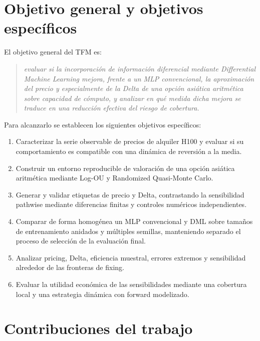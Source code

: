 \section{Objetivo general y objetivos específicos}
\label{sec:objetivos}

El objetivo general del TFM es:

\begin{quote}
\emph{evaluar si la incorporación de información diferencial mediante
Differential Machine Learning mejora, frente a un MLP convencional, la
aproximación del precio y especialmente de la Delta de una opción asiática
aritmética sobre capacidad de cómputo, y analizar en qué medida dicha mejora
se traduce en una reducción efectiva del riesgo de cobertura.}
\end{quote}

Para alcanzarlo se establecen los siguientes objetivos específicos:

\begin{enumerate}
    \item Caracterizar la serie observable de precios de alquiler H100 y evaluar
    si su comportamiento es compatible con una dinámica de reversión a la media.

    \item Construir un entorno reproducible de valoración de una opción asiática
    aritmética mediante Log-OU y Randomized Quasi-Monte Carlo.

    \item Generar y validar etiquetas de precio y Delta, contrastando la
    sensibilidad pathwise mediante diferencias finitas y controles numéricos
    independientes.

    \item Comparar de forma homogénea un MLP convencional y DML sobre tamaños de
    entrenamiento anidados y múltiples semillas, manteniendo separado el proceso
    de selección de la evaluación final.

    \item Analizar pricing, Delta, eficiencia muestral, errores extremos y
    sensibilidad alrededor de las fronteras de fixing.

    \item Evaluar la utilidad económica de las sensibilidades mediante una
    cobertura local y una estrategia dinámica con forward modelizado.
\end{enumerate}

\section{Contribuciones del trabajo}
\label{sec:contribuciones}

